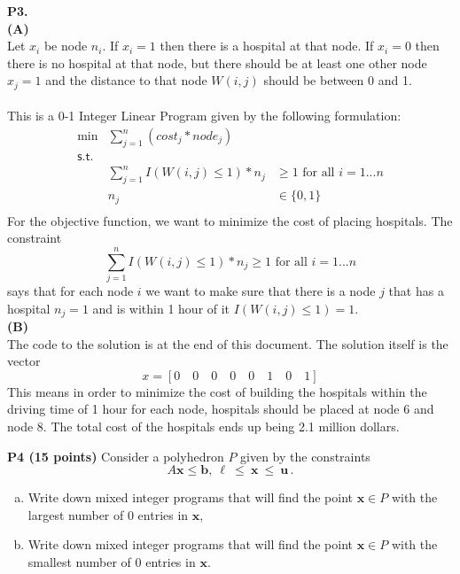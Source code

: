 \documentclass[11pt]{article}
\begin{document}
\medskip

\newpage
\noindent\textbf{P3.}
\\
\noindent\textbf{(A)}
\\
Let $x_i$ be node $n_i$.  If $x_i = 1$ then there is a hospital at that node.  If $x_i = 0$ then there is no hospital at that node, but there should be at least one other node $x_j = 1$ and the distance to that node $W(i,j)$ should be between 0 and 1.\\ \\
This is a 0-1 Integer Linear Program given by the following formulation:
\[\begin{array}{rlllllllll}
\min & \sum_{j=1}^{n} (cost_j*node_j) \\
\mathsf{s.t. } \\
& \sum_{j=1}^{n} I(W(i,j) \leq 1)*n_j & \geq 1 \text{ for all }i = 1...n\\
& n_j & \in \{0,1\} \\
\end{array}\]
For the objective function, we want to minimize the cost of placing hospitals.
The constraint
$$
\sum_{j=1}^{n} I(W(i,j) \leq 1)*n_j \geq 1 \text{ for all }i = 1...n
$$
says that for each node $i$ we want to make sure that there is a node $j$ that has a hospital $n_j = 1$ and is within 1 hour of it $I(W(i,j) \leq 1) = 1$. \\

\noindent\textbf{(B)}
\\
The code to the solution is at the end of this document.  The solution itself is the vector 
$$x = [0\quad0\quad0\quad0\quad0\quad1\quad0\quad1]$$
This means in order to minimize the cost of building the hospitals within the driving time of 1 hour for each node, hospitals should be placed at node 6 and node 8.  The total cost of the hospitals ends up being 2.1 million dollars.  

\medskip
\newpage
\noindent\textbf{P4 (15 points)} Consider a polyhedron $P$ given
by the constraints
 \[ A \mathbf{x} \leq \mathbf{b},\ \mathbf{\ell}\ \leq\ \mathbf{x}\ \leq\ \mathbf{u}\,. \]


\begin{enumerate}[(a)]
\item  Write down mixed integer programs that will find the
point $\mathbf{x} \in P$ with the largest number of
$0$ entries in $\mathbf{x}$, 
\item Write down mixed integer programs that will find the
point $\mathbf{x} \in P$ with the smallest number of $0$ entries in $\mathbf{x}$.
\end{enumerate}
\end{document}

